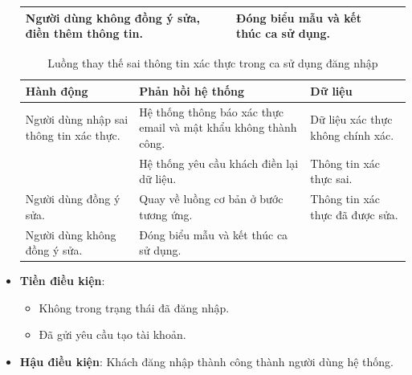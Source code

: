 \documentclass[./../main.tex]{subfiles}
\begin{document}
\begin{itemize}
\begin{table}[H]
\begin{tabularx}{\textwidth}{| X | X | X |}
            \\ \hline
            Người dùng không đồng ý sửa, điền thêm thông tin. & Đóng biểu mẫu và kết thúc ca sử dụng. & 
            \\ \hline
        \end{tabularx}
        \end{table}  
        \begin{table}[H]
        \caption{\label{uc-6}Luồng thay thế sai thông tin xác thực trong ca sử dụng đăng nhập}
        \begin{tabularx}{\textwidth}{| X | X | X |}
            \hline
            \textbf{Hành động} & \textbf{Phản hồi hệ thống} & \textbf{Dữ liệu} \\ \hline
            Người dùng nhập sai thông tin xác thực. & Hệ thống thông báo xác thực email và mật khẩu không thành công. & Dữ liệu xác thực không chính xác.
            \\ \hline
            & Hệ thống yêu cầu khách điền lại dữ liệu. & Thông tin xác thực sai.
            \\ \hline
            Người dùng đồng ý sửa. & Quay về luồng cơ bản ở bước tương ứng. & Thông tin xác thực đã được sửa.
            \\ \hline
            Người dùng không đồng ý sửa. & Đóng biểu mẫu và kết thúc ca sử dụng. & 
            \\ \hline
        \end{tabularx}
        \end{table}  
    \item \textbf{Tiền điều kiện}:
        \begin{itemize}
            \item{Không trong trạng thái đã đăng nhập.\\}
            \item{Đã gửi yêu cầu tạo tài khoản.}
        \end{itemize}
    \item \textbf{Hậu điều kiện}: Khách đăng nhập thành công thành người dùng hệ thống.
\end{itemize}
\end{document}
